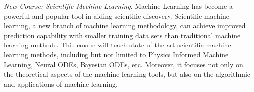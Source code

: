 \documentclass[11pt]{NSFamsart}
\begin{document}


\emph{New Course: Scientific Machine Learning}. 
Machine Learning has become a powerful and popular tool in aiding scientific discovery.  Scientific machine learning, a new branch of machine learning methodology, can achieve improved prediction capability with smaller training data sets than traditional machine learning methods. This course will teach state-of-the-art scientific machine learning methods, including but not limited to Physics Informed Machine Learning, Neural ODEs, Bayesian ODEs, etc.  Moreover, it focuses not only on the theoretical aspects of the machine learning tools, but also on the algorithmic and applications of machine learning.   

 
\end{document}
